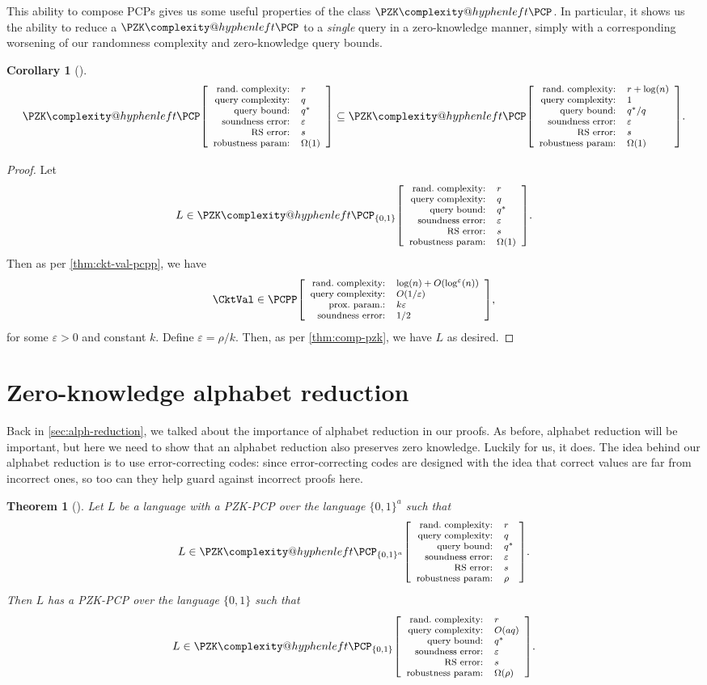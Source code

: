 \documentclass[english,12pt]{reedthesis}
\makeatletter
\theoremstyle{plain}
\newtheorem{thm}{Theorem}[section]
\newtheorem{cor}[cor]{Corollary}
\theoremstyle{definition}
\theoremstyle{remark}
\newcommand{\pcpp}[4]{%
  \ensuremath%
  \mleft[{\footnotesize\begin{array}{r l}
    \text{rand.\ complexity:} & #1 \\
    \text{query complexity:} & #2 \\
    \text{prox.\ param.:} & #3 \\
    \text{soundness error:} & #4
  \end{array}}\mright]%
}
\newcommand{\pzkpcpr}[6]{%
  \ensuremath%
  \mleft[{\footnotesize\begin{array}{r l}
    \text{rand.\ complexity:} & #1 \\
    \text{query complexity:} & #2 \\
    \text{query bound:} & #3 \\
    \text{soundness error:} & #4 \\
    \text{RS error:} & #5 \\
    \text{robustness param:} & #6
  \end{array}}\mright]%
}
\newcommand{\PZKPCP}{%
  \PZK\complexity@hyphenleft\PCP
}
\makeatother
\begin{document}
This ability to compose PCPs gives us some useful properties of the class
$\PZKPCP$. In particular, it shows us the ability to reduce a $\PZKPCP$ to a
\emph{single} query in a zero-knowledge manner, simply with a corresponding
worsening of our randomness complexity and zero-knowledge query bounds.

\begin{cor}[{\cite[Corollary 3.11]{GOS25}}]\label{cor:pzk-constant-query}
  \begin{equation}\label{eqn:pzk-constant-query}
    \PZKPCP\pzkpcpr{r}{q}{q^{*}}{\varepsilon}{s}{\Omega(1)} \subseteq
    \PZKPCP\pzkpcpr{r + \log(n)}{1}{q^{*}/q}{\varepsilon}{s}{\Omega(1)}.
  \end{equation}
\end{cor}

\begin{proof}
  Let
  \begin{equation}
    L \in \PZKPCP_{\{0, 1\}}\pzkpcpr{r}{q}{q^{*}}{\varepsilon}{s}{\Omega(1)}.
  \end{equation}
  Then as per \cref{thm:ckt-val-pcpp}, we have
  \begin{equation}
    \CktVal \in \PCPP\pcpp{\log(n) + O(\log^{\varepsilon}(n))}{O(1/\varepsilon)}{k\varepsilon}{1/2},
  \end{equation}
  for some $\varepsilon > 0$ and constant $k$. Define $\varepsilon = \rho/k$. Then, as per
  \cref{thm:comp-pzk}, we have $L$ as desired.
\end{proof}

\section{Zero-knowledge alphabet reduction}\label{sec:zk-alph-red}

Back in \cref{sec:alph-reduction}, we talked about the importance of alphabet
reduction in our proofs. As before, alphabet reduction will be important, but
here we need to show that an alphabet reduction also preserves zero knowledge.
Luckily for us, it does. The idea behind our alphabet reduction is to use
error-correcting codes: since error-correcting codes are designed with the idea
that correct values are far from incorrect ones, so too can they help guard
against incorrect proofs here.

\begin{thm}[{\cite[Lemma 2.13]{BGHSV06}}]%
  \label{thm:zk-alph-red}\label{alphabet reduction!zero-knowledge}
  Let $L$ be a language with a PZK-PCP over the language $\{0, 1\}^{a}$ such
  that
  \[
    L \in \PZKPCP_{\{0,1\}^{a}}\pzkpcpr{r}{q}{q^{*}}{\varepsilon}{s}{\rho}.
  \]
  Then $L$ has a PZK-PCP over the language $\{0, 1\}$ such that
  \[
    L \in \PZKPCP_{\{0,1\}}\pzkpcpr{r}{O(aq)}{q^{*}}{\varepsilon}{s}{\Omega(\rho)}.
  \]
\end{thm}
\end{document}
